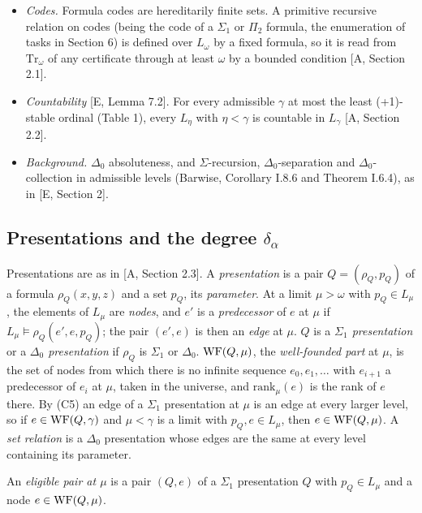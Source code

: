 \documentclass[11pt]{article}
\begin{document}
\begin{itemize}
  $\nu$; it is used only inside bounded conditions, where quantifiers over it are read as quantifiers over $W$ guarded by
  the index [A, Section 2.3].
\item \emph{Codes.} Formula codes are hereditarily finite sets. A primitive recursive relation on codes (being the
  code of a $\Sigma_1$ or $\Pi_2$ formula, the enumeration of tasks in Section 6) is defined over $L_\omega$ by a fixed
  formula, so it is read from $\mathrm{Tr}_\omega$ of any certificate through at least $\omega$ by a bounded condition [A, Section 2.1].
\item \emph{Countability} [E, Lemma 7.2]. For every admissible $\gamma$ at most the least (+1)-stable ordinal
  (Table 1), every $L_\eta$ with $\eta < \gamma$ is countable in $L_\gamma$ [A, Section 2.2].
\item \emph{Background.} $\Delta_0$ absoluteness, and $\Sigma$-recursion, $\Delta_0$-separation and
  $\Delta_0$-collection in admissible levels (Barwise, Corollary I.8.6 and Theorem I.6.4), as in [E, Section 2].
\end{itemize}

\subsection{\texorpdfstring{Presentations and the degree $\delta_\alpha$}{Presentations and the degree delta alpha}}

Presentations are as in [A, Section 2.3]. A \emph{presentation} is a pair $Q = (\rho_Q, p_Q)$ of a formula
$\rho_Q(x,y,z)$ and a set $p_Q$, its \emph{parameter}. At a limit $\mu > \omega$ with $p_Q \in L_\mu$, the elements of
$L_\mu$ are \emph{nodes}, and $e'$ is a \emph{predecessor} of $e$ at $\mu$ if $L_\mu \models \rho_Q(e', e, p_Q)$; the
pair $(e', e)$ is then an \emph{edge} at $\mu$. $Q$ is a \emph{$\Sigma_1$ presentation} or a \emph{$\Delta_0$
presentation} if $\rho_Q$ is $\Sigma_1$ or $\Delta_0$. $\mathrm{WF}(Q, \mu)$, the \emph{well-founded part} at $\mu$, is the set
of nodes from which there is no infinite sequence $e_0, e_1, \dots$ with $e_{i+1}$ a predecessor of $e_i$ at $\mu$,
taken in the universe, and $\mathrm{rank}_\mu(e)$ is the rank of $e$ there. By (C5) an edge of a $\Sigma_1$ presentation
at $\mu$ is an edge at every larger level, so if $e \in \mathrm{WF}(Q,\gamma)$ and $\mu < \gamma$ is a limit with $p_Q, e \in
L_\mu$, then $e \in \mathrm{WF}(Q,\mu)$. A \emph{set relation} is a $\Delta_0$ presentation whose edges are the same at every
level containing its parameter.

An \emph{eligible pair at $\mu$} is a pair $(Q, e)$ of a $\Sigma_1$ presentation $Q$ with $p_Q \in L_\mu$ and a node $e
\in \mathrm{WF}(Q, \mu)$.
\end{document}
